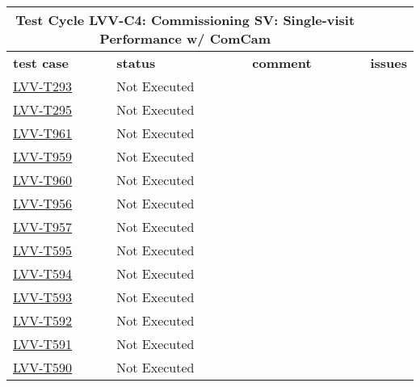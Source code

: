 \documentclass[DM,lsstdraft,STR,toc]{lsstdoc}
\begin{document}
\begin{longtable}{p{}p{}p{}p{}}
\toprule

  \multicolumn{3}{c}{ Test Cycle {\bf LVV-C4: Commissioning SV: Single-visit Performance w/ ComCam
 }} \\\hline

  {\bf \footnotesize test case} & {\bf \footnotesize status} & {\bf \footnotesize comment} & {\bf \footnotesize issues} \\\toprule

    \href{https://jira.lsstcorp.org/secure/Tests.jspa#/testCase/LVV-T293}{LVV-T293}
    & Not Executed &  &
    \\\hline
    \href{https://jira.lsstcorp.org/secure/Tests.jspa#/testCase/LVV-T295}{LVV-T295}
    & Not Executed &  &
    \\\hline
    \href{https://jira.lsstcorp.org/secure/Tests.jspa#/testCase/LVV-T961}{LVV-T961}
    & Not Executed &  &
    \\\hline
    \href{https://jira.lsstcorp.org/secure/Tests.jspa#/testCase/LVV-T959}{LVV-T959}
    & Not Executed &  &
    \\\hline
    \href{https://jira.lsstcorp.org/secure/Tests.jspa#/testCase/LVV-T960}{LVV-T960}
    & Not Executed &  &
    \\\hline
    \href{https://jira.lsstcorp.org/secure/Tests.jspa#/testCase/LVV-T956}{LVV-T956}
    & Not Executed &  &
    \\\hline
    \href{https://jira.lsstcorp.org/secure/Tests.jspa#/testCase/LVV-T957}{LVV-T957}
    & Not Executed &  &
    \\\hline
    \href{https://jira.lsstcorp.org/secure/Tests.jspa#/testCase/LVV-T595}{LVV-T595}
    & Not Executed &  &
    \\\hline
    \href{https://jira.lsstcorp.org/secure/Tests.jspa#/testCase/LVV-T594}{LVV-T594}
    & Not Executed &  &
    \\\hline
    \href{https://jira.lsstcorp.org/secure/Tests.jspa#/testCase/LVV-T593}{LVV-T593}
    & Not Executed &  &
    \\\hline
    \href{https://jira.lsstcorp.org/secure/Tests.jspa#/testCase/LVV-T592}{LVV-T592}
    & Not Executed &  &
    \\\hline
    \href{https://jira.lsstcorp.org/secure/Tests.jspa#/testCase/LVV-T591}{LVV-T591}
    & Not Executed &  &
    \\\hline
    \href{https://jira.lsstcorp.org/secure/Tests.jspa#/testCase/LVV-T590}{LVV-T590}
    & Not Executed &  &

\end{longtable}
\end{document}
